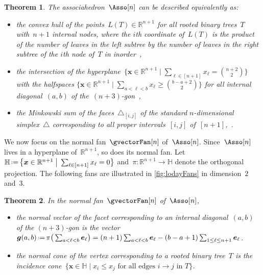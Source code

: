 \documentclass{amsart}
\newtheorem{theorem}{Theorem}[section]
\theoremstyle{definition}
\newcommand{\R}{\mathbb{R}} %
\newcommand{\HH}{\mathbb{H}} %
\renewcommand{\b}[1]{{\boldsymbol{#1}}} %
\newcommand{\bigset}[2]{\big\{ #1 \;\big|\; #2 \big\}} %
\newcommand{\eqdef}{\mbox{\,\raisebox{0.2ex}{\scriptsize\ensuremath{\mathrm:}}\ensuremath{=}\,}} %
\newcommand{\simplex}{\triangle} %
\newcommand{\gvector}[1]{\b{g}(#1)} %
\begin{document}
\begin{theorem}
\label{thm:associahedronLoday}
The associahedron~$\Asso[n]$ can be described equivalently as:
\begin{itemize}
\item the convex hull of the points~$L(T) \in \R^{n+1}$ for all rooted binary trees~$T$ with~$n+1$ internal nodes, where the $i$th coordinate of~$L(T)$ is the product of the number of leaves in the left subtree by the number of leaves in the right subtree of the $i$th node of~$T$ in inorder~\cite{Loday},
\item the intersection of the hyperplane~$\bigset{\b{x} \in \R^{n+1}}{\sum_{\ell \in [n+1]} x_\ell = \binom{n+2}{2}}$ with the halfspaces $\bigset{\b{x} \in \R^{n+1}}{\sum_{a < \ell < b} x_\ell \ge \binom{b-a+2}{2}}$ for all internal diagonal~$(a,b)$ of \mbox{the $(n+3)$-gon~\cite{ShniderSternberg}},
\item the Minkowski sum of the faces~$\simplex_{[i,j]}$ of the standard $n$-dimensional simplex~$\simplex$ corresponding to all proper intervals~$[i,j]$ of~$[n+1]$,~\cite{Postnikov}.
\end{itemize}
\end{theorem}

We now focus on the normal fan~$\gvectorFan[n]$ of~$\Asso[n]$.
Since~$\Asso[n]$ lives in a hyperplane of~$\R^{n+1}$, so does its normal fan.
Let~$\HH \eqdef \bigset{\b{x} \in \R^{n+1}}{\sum_{\ell \in [n+1]} x_\ell = 0}$ and~$\pi : \R^{n+1} \to \HH$ denote the orthogonal projection.
The following fans are illustrated in \cref{fig:lodayFans} in dimension~$2$ and~$3$.

\begin{theorem}
\label{thm:normalFanLoday}
In the normal fan~$\gvectorFan[n]$ of~$\Asso[n]$, 
\begin{itemize}
\item the normal vector of the facet corresponding to an internal diagonal~$(a,b)$ of the $(n+3)$-gon is the vector~$\gvector{a,b} \eqdef \pi\big( \sum_{a < \ell < b} \b{e}_\ell \big) = (n+1) \sum_{a < \ell < b} \b{e}_\ell - (b-a+1) \sum_{1 \le \ell \le n+1} \b{e}_\ell$.
\item the normal cone of the vertex corresponding to a rooted binary tree~$T$ is the incidence cone~$\bigset{\b{x} \in \HH}{x_i \le x_j \text{ for all edges $i \to j$ in $T$}}$.
\end{itemize}
\end{theorem}
\end{document}
